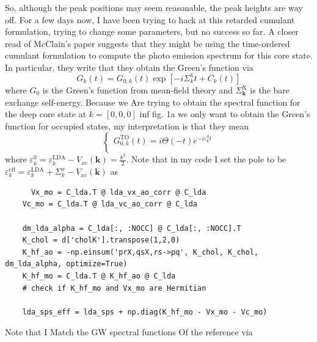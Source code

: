 So, although the peak positions may seem reasonable, the peak heights are way off. For a few days now, I have been trying to hack at this retarded cumulant formulation, trying to change some parameters, but no success so far. A closer read of McClain's paper suggests that they might be using the time-ordered cumulant formulation to compute the photo emission spectrum for this core state. 
In particular, they write that they obtain the Green's function via 
\begin{equation}
    G_k(t) = G_{0, k}(t) \exp \left[-i \Sigma_k^{\mathrm{x}} t+C_k(t)\right]
\end{equation}
 where $G_0$ is the Green's function from mean-field theory and $\Sigma_{\boldsymbol{k}}^{\mathrm{X}}$ is the bare exchange self-energy. Because we Are trying to obtain the spectral function for the deep core state at $k=[0,0,0]$ inf fig. 1a we only want to obtain the Green's function for occupied states, my interpretation is that they mean
\begin{equation}
\begin{cases}
G_{0, k}^{\text{TO}}(t) = i\Theta(-t) e^{-i \varepsilon^0_k t} \\
\end{cases}
\end{equation}
where $\varepsilon^0_k=\varepsilon_k^{\text{LDA}}-V_{xc}(\mathbf{k})=\frac{k^2}{2}$. Note that in my code I set the pole to be $\varepsilon^{\text{eff}}_k=\varepsilon_k^{\text{LDA}}+\Sigma^x_k - V_{xc}(\mathbf{k})$ as
\begin{verbatim}
      Vx_mo = C_lda.T @ lda_vx_ao_corr @ C_lda
    Vc_mo = C_lda.T @ lda_vc_ao_corr @ C_lda

    dm_lda_alpha = C_lda[:, :NOCC] @ C_lda[:, :NOCC].T
    K_chol = d['cholK'].transpose(1,2,0)
    K_hf_ao = -np.einsum('prX,qsX,rs->pq', K_chol, K_chol, dm_lda_alpha, optimize=True)
    K_hf_mo = C_lda.T @ K_hf_ao @ C_lda
    # check if K_hf_mo and Vx_mo are Hermitian

    lda_sps_eff = lda_sps + np.diag(K_hf_mo - Vx_mo - Vc_mo)
\end{verbatim}
 Note that I Match the  GW spectral functions Of the reference  via
